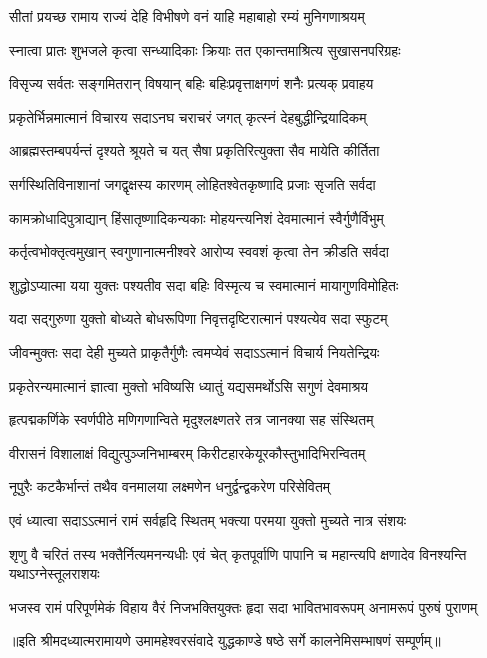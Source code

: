


\addtocounter{shlokacount}{45}


\twolineshloka
{सीतां प्रयच्छ रामाय राज्यं देहि विभीषणे}
{वनं याहि महाबाहो रम्यं मुनिगणाश्रयम्} %

\twolineshloka
{स्नात्वा प्रातः शुभजले कृत्वा सन्ध्यादिकाः क्रियाः}
{तत एकान्तमाश्रित्य सुखासनपरिग्रहः} %

\twolineshloka
{विसृज्य सर्वतः सङ्गमितरान् विषयान् बहिः}
{बहिःप्रवृत्ताक्षगणं शनैः प्रत्यक् प्रवाहय} %

\twolineshloka
{प्रकृतेर्भिन्नमात्मानं विचारय सदाऽनघ}
{चराचरं जगत् कृत्स्नं देहबुद्धीन्द्रियादिकम्} %

\twolineshloka
{आब्रह्मस्तम्बपर्यन्तं दृश्यते श्रूयते च यत्}
{सैषा प्रकृतिरित्युक्ता सैव मायेति कीर्तिता} %

\twolineshloka
{सर्गस्थितिविनाशानां जगद्वृक्षस्य कारणम्}
{लोहितश्वेतकृष्णादि प्रजाः सृजति सर्वदा} %

\twolineshloka
{कामक्रोधादिपुत्राद्यान् हिंसातृष्णादिकन्यकाः}
{मोहयन्त्यनिशं देवमात्मानं स्वैर्गुणैर्विभुम्} %

\twolineshloka
{कर्तृत्वभोक्तृत्वमुखान् स्वगुणानात्मनीश्वरे}
{आरोप्य स्ववशं कृत्वा तेन क्रीडति सर्वदा} %

\twolineshloka
{शुद्धोऽप्यात्मा यया युक्तः पश्यतीव सदा बहिः}
{विस्मृत्य च स्वमात्मानं मायागुणविमोहितः} %

\twolineshloka
{यदा सद्गुरुणा युक्तो बोध्यते बोधरूपिणा}
{निवृत्तदृष्टिरात्मानं पश्यत्येव सदा स्फुटम्} %

\twolineshloka
{जीवन्मुक्तः सदा देही मुच्यते प्राकृतैर्गुणैः}
{त्वमप्येवं सदाऽऽत्मानं विचार्य नियतेन्द्रियः} %

\twolineshloka
{प्रकृतेरन्यमात्मानं ज्ञात्वा मुक्तो भविष्यसि}
{ध्यातुं यद्यसमर्थोऽसि सगुणं देवमाश्रय} %

\twolineshloka
{हृत्पद्मकर्णिके स्वर्णपीठे मणिगणान्विते}
{मृदुश्लक्ष्णतरे तत्र जानक्या सह संस्थितम्} %

\twolineshloka
{वीरासनं विशालाक्षं विद्युत्पुञ्जनिभाम्बरम्}
{किरीटहारकेयूरकौस्तुभादिभिरन्वितम्} %

\twolineshloka
{नूपुरैः कटकैर्भान्तं तथैव वनमालया}
{लक्ष्मणेन धनुर्द्वन्द्वकरेण परिसेवितम्} %

\twolineshloka
{एवं ध्यात्वा सदाऽऽत्मानं रामं सर्वहृदि स्थितम्}
{भक्त्या परमया युक्तो मुच्यते नात्र संशयः} %

\threelineshloka
{शृणु वै चरितं तस्य भक्तैर्नित्यमनन्यधीः}
{एवं चेत् कृतपूर्वाणि पापानि च महान्त्यपि}
{क्षणादेव विनश्यन्ति यथाऽग्नेस्तूलराशयः} %

\fourlineindentedshloka
{भजस्व रामं परिपूर्णमेकं}
{विहाय वैरं निजभक्तियुक्तः}
{हृदा सदा भावितभावरूपम्}
{अनामरूपं पुरुषं पुराणम्} %

{॥इति श्रीमदध्यात्मरामायणे उमामहेश्वरसंवादे युद्धकाण्डे
षष्ठे सर्गे कालनेमिसम्भाषणं सम्पूर्णम्॥}
